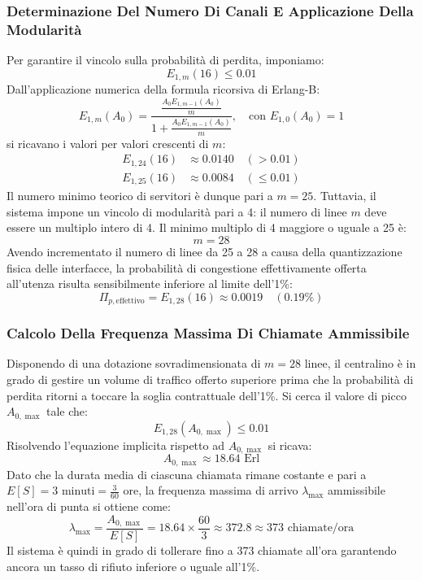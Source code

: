 \documentclass[11pt, a4paper]{article}
\begin{document}

\subsubsection{Determinazione Del Numero Di Canali E Applicazione Della Modularità}

Per garantire il vincolo sulla probabilità di perdita, imponiamo:
\[
E_{1,m}(16) \le 0.01
\]
Dall'applicazione numerica della formula ricorsiva di Erlang-B:
\[
E_{1,m}(A_0) = \frac{\displaystyle\frac{A_0 E_{1,m-1}(A_0)}{m}}{1 + \displaystyle\frac{A_0 E_{1,m-1}(A_0)}{m}}, \quad \text{con } E_{1,0}(A_0) = 1
\]
si ricavano i valori per valori crescenti di $m$:
\begin{align*}
    E_{1,24}(16) &\approx 0.0140 \quad (> 0.01) \\
    E_{1,25}(16) &\approx 0.0084 \quad (\le 0.01)
\end{align*}
Il numero minimo teorico di servitori è dunque pari a $m = 25$. Tuttavia, il sistema impone un vincolo di modularità pari a 4: il numero di linee $m$ deve essere un multiplo intero di 4. Il minimo multiplo di 4 maggiore o uguale a 25 è:
\[
m = 28
\]
Avendo incrementato il numero di linee da 25 a 28 a causa della quantizzazione fisica delle interfacce, la probabilità di congestione effettivamente offerta all'utenza risulta sensibilmente inferiore al limite dell'1\%:
\[
\Pi_{p,\text{effettivo}} = E_{1,28}(16) \approx 0.0019 \quad (0.19\%)
\]


\subsubsection{Calcolo Della Frequenza Massima Di Chiamate Ammissibile}

Disponendo di una dotazione sovradimensionata di $m = 28$ linee, il centralino è in grado di gestire un volume di traffico offerto superiore prima che la probabilità di perdita ritorni a toccare la soglia contrattuale dell'1\%. Si cerca il valore di picco $A_{0,\max}$ tale che:
\[
E_{1,28}(A_{0,\max}) \le 0.01
\]
Risolvendo l'equazione implicita rispetto ad $A_{0,\max}$ si ricava:
\[
A_{0,\max} \approx 18.64\text{ Erl}
\]
Dato che la durata media di ciascuna chiamata rimane costante e pari a $E[S] = 3\text{ minuti} = \frac{3}{60}\text{ ore}$, la frequenza massima di arrivo $\lambda_{\max}$ ammissibile nell'ora di punta si ottiene come:
\[
\lambda_{\max} = \frac{A_{0,\max}}{E[S]} = 18.64 \times \frac{60}{3} \approx 372.8 \approx 373\text{ chiamate/ora}
\]
Il sistema è quindi in grado di tollerare fino a 373 chiamate all'ora garantendo ancora un tasso di rifiuto inferiore o uguale all'1\%.
\end{document}
